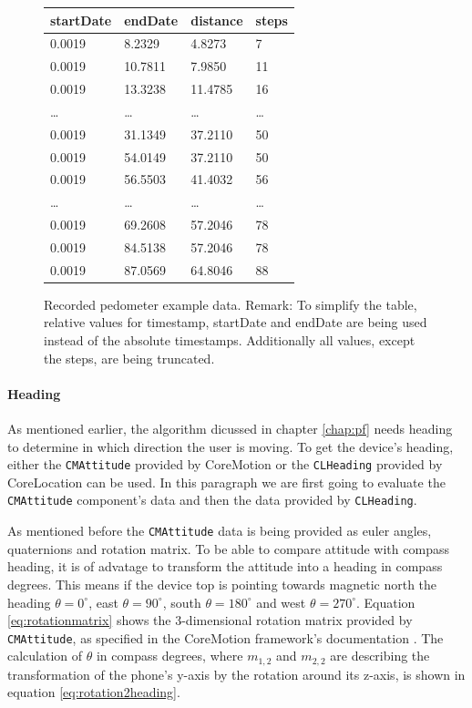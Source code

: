 \begin{center}
\begin{figure}
\begin{tabular}{*{4}{l}}
startDate & endDate & distance & steps\\
\hline
0.0019 & 8.2329 & 4.8273 & 7\\
0.0019 & 10.7811 & 7.9850 & 11\\
0.0019 & 13.3238 & 11.4785 & 16\\
\dots & \dots & \dots & \dots\\
0.0019 & 31.1349 & 37.2110 & 50\\
0.0019 & 54.0149 & 37.2110 & 50\\
0.0019 & 56.5503 & 41.4032 & 56\\
\dots & \dots & \dots & \dots\\
0.0019 & 69.2608 & 57.2046 & 78\\
0.0019 & 84.5138 & 57.2046 & 78\\
0.0019 & 87.0569 & 64.8046 & 88
\end{tabular}
\caption{Recorded pedometer example data.
Remark: To simplify the table, relative values for timestamp, startDate and endDate are being used instead of the absolute timestamps.
Additionally all values, except the steps, are being truncated.}
\label{fig:eval:pedometerExampleData}
\end{figure}
\end{center}


\paragraph{Heading}
As mentioned earlier, the algorithm dicussed in chapter \ref{chap:pf} needs heading to determine in which direction the user is moving.
To get the device's heading, either the \texttt{CMAttitude} provided by CoreMotion or the \texttt{CLHeading} provided by CoreLocation can be used.
In this paragraph we are first going to evaluate the \texttt{CMAttitude} component's data and then the data provided by \texttt{CLHeading}.

As mentioned before the \texttt{CMAttitude} data is being provided as euler angles, quaternions and rotation matrix.
To be able to compare attitude with compass heading, it is of advatage to transform the attitude into a heading in compass degrees.
This means if the device top is pointing towards magnetic north the heading $\theta = 0^{\circ}$,  east $\theta = 90^{\circ}$,  south $\theta = 180^{\circ}$ and west $\theta = 270^{\circ}$.
Equation \ref{eq:rotationmatrix} shows the 3-dimensional rotation matrix provided by \texttt{CMAttitude}, as specified in the CoreMotion framework's documentation \cite{ios_cm}.
The calculation of $\theta$ in compass degrees, where $m_{1,2}$ and $m_{2,2}$ are describing the transformation of the phone's y-axis by the rotation around its z-axis, is shown in equation \ref{eq:rotation2heading}.

